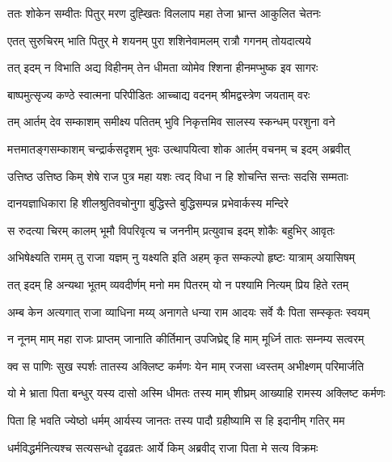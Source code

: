 \twolineshloka
{ततः शोकेन सम्वीतः पितुर् मरण दुह्खितः}
{विललाप महा तेजा भ्रान्त आकुलित चेतनः} %

\twolineshloka
{एतत् सुरुचिरम् भाति पितुर् मे शयनम् पुरा}
{शशिनेवामलम् रात्रौ गगनम् तोयदात्यये} %

\twolineshloka
{तत् इदम् न विभाति अद्य विहीनम् तेन धीमता}
{व्योमेव श्शिना हीनमप्भुष्क इव सागरः} %

\twolineshloka
{बाष्पमुत्सृज्य कण्ठे स्वात्मना परिपीडितः}
{आच्चाद्य वदनम् श्रीमद्वस्त्रेण जयताम् वरः} %

\twolineshloka
{तम् आर्तम् देव सम्काशम् समीक्ष्य पतितम् भुवि}
{निकृत्तमिव सालस्य स्कन्धम् परशुना वने} %

\twolineshloka
{मत्तमातङ्गसम्काशम् चन्द्रार्कसदृशम् भुवः}
{उत्थापयित्वा शोक आर्तम् वचनम् च इदम् अब्रवीत्} %

\twolineshloka
{उत्तिष्ठ उत्तिष्ठ किम् शेषे राज पुत्र महा यशः}
{त्वद् विधा न हि शोचन्ति सन्तः सदसि सम्मताः} %

\twolineshloka
{दानयज्ञाधिकारा हि शीलश्रुतिवचोनुगा}
{बुद्धिस्ते बुद्धिसम्पन्न प्रभेवार्कस्य मन्दिरे} %

\twolineshloka
{स रुदत्या चिरम् कालम् भूमौ विपरिवृत्य च}
{जननीम् प्रत्युवाच इदम् शोकैः बहुभिर् आवृतः} %

\twolineshloka
{अभिषेक्ष्यति रामम् तु राजा यज्ञम् नु यक्ष्यति}
{इति अहम् कृत सम्कल्पो हृष्टः यात्राम् अयासिषम्} %

\twolineshloka
{तत् इदम् हि अन्यथा भूतम् व्यवदीर्णम् मनो मम}
{पितरम् यो न पश्यामि नित्यम् प्रिय हिते रतम्} %

\twolineshloka
{अम्ब केन अत्यगात् राजा व्याधिना मय्य् अनागते}
{धन्या राम आदयः सर्वे यैः पिता सम्स्कृतः स्वयम्} %

\twolineshloka
{न नूनम् माम् महा राजः प्राप्तम् जानाति कीर्तिमान्}
{उपजिघ्रेद्द् हि माम् मूर्ध्नि तातः सम्नम्य सत्वरम्} %

\twolineshloka
{क्व स पाणिः सुख स्पर्शः तातस्य अक्लिष्ट कर्मणः}
{येन माम् रजसा ध्वस्तम् अभीक्ष्णम् परिमार्जति} %

\twolineshloka
{यो मे भ्राता पिता बन्धुर् यस्य दासो अस्मि धीमतः}
{तस्य माम् शीघ्रम् आख्याहि रामस्य अक्लिष्ट कर्मणः} %

\twolineshloka
{पिता हि भवति ज्येष्ठो धर्मम् आर्यस्य जानतः}
{तस्य पादौ ग्रहीष्यामि स हि इदानीम् गतिर् मम} %

\twolineshloka
{धर्मविद्धर्मनित्यश्च सत्यसन्धो दृढव्रतः}
{आर्ये किम् अब्रवीद् राजा पिता मे सत्य विक्रमः} %

